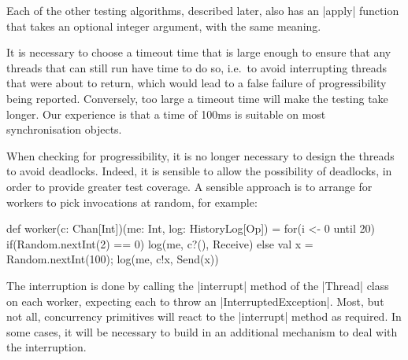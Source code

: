 Each of the other testing algorithms, described later, also has an |apply|
function that takes an optional integer argument, with the same meaning. 

It is necessary to choose a timeout time that is large enough to ensure that
any threads that can still run have time to do so, i.e.~to avoid interrupting
threads that were about to return, which would lead to a false failure of
progressibility being reported.  Conversely, too large a timeout time will
make the testing take longer.  Our experience is that a time of 100ms is
suitable on most synchronisation objects.

When checking for progressibility, it is no longer necessary to design the
threads to avoid deadlocks.  Indeed, it is sensible to allow the possibility
of deadlocks, in order to provide greater test coverage.  A sensible approach
is to arrange for workers to pick invocations at random, for example:
%
\begin{scala}
  def worker(c: Chan[Int])(me: Int, log: HistoryLog[Op]) = {
    for(i <- 0 until 20)
      if(Random.nextInt(2) == 0) log(me, c?(), Receive)
      else{ val x = Random.nextInt(100); log(me, c!x, Send(x)) }
  }
\end{scala}

The interruption is done by calling the |interrupt| method of the |Thread|
class on each worker, expecting each to throw an |InterruptedException|.
Most, but not all, concurrency primitives will react to the |interrupt| method
as required.  In some cases, it will be necessary to build in an additional
mechanism to deal with the interruption.   


